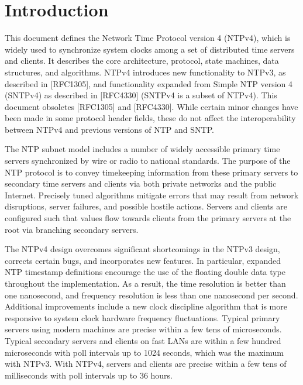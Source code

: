 \chapter{Introduction}

This document defines the Network Time Protocol version 4 (NTPv4),
which is widely used to synchronize system clocks among a set of
distributed time servers and clients. It describes the core
architecture, protocol, state machines, data structures, and
algorithms. NTPv4 introduces new functionality to NTPv3, as
described in [RFC1305], and functionality expanded from Simple NTP
version 4 (SNTPv4) as described in [RFC4330] (SNTPv4 is a subset of
NTPv4). This document obsoletes [RFC1305] and [RFC4330]. While
certain minor changes have been made in some protocol header fields,
these do not affect the interoperability between NTPv4 and previous
versions of NTP and SNTP.

The NTP subnet model includes a number of widely accessible primary
time servers synchronized by wire or radio to national standards.
The purpose of the NTP protocol is to convey timekeeping information
from these primary servers to secondary time servers and clients via
both private networks and the public Internet. Precisely tuned
algorithms mitigate errors that may result from network disruptions,
server failures, and possible hostile actions. Servers and clients
are configured such that values flow towards clients from the primary
servers at the root via branching secondary servers.

The NTPv4 design overcomes significant shortcomings in the NTPv3
design, corrects certain bugs, and incorporates new features. In
particular, expanded NTP timestamp definitions encourage the use of
the floating double data type throughout the implementation. As a
result, the time resolution is better than one nanosecond, and
frequency resolution is less than one nanosecond per second.
Additional improvements include a new clock discipline algorithm that
is more responsive to system clock hardware frequency fluctuations.
Typical primary servers using modern machines are precise within a
few tens of microseconds. Typical secondary servers and clients on
fast LANs are within a few hundred microseconds with poll intervals
up to 1024 seconds, which was the maximum with NTPv3. With NTPv4,
servers and clients are precise within a few tens of milliseconds
with poll intervals up to 36 hours.

